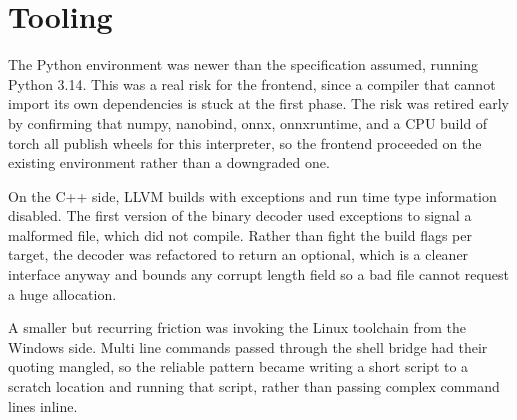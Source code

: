 \section{Tooling}

The Python environment was newer than the specification assumed, running Python
3.14. This was a real risk for the frontend, since a compiler that cannot import
its own dependencies is stuck at the first phase. The risk was retired early by
confirming that numpy, nanobind, onnx, onnxruntime, and a CPU build of torch all
publish wheels for this interpreter, so the frontend proceeded on the existing
environment rather than a downgraded one.

On the C++ side, LLVM builds with exceptions and run time type information
disabled. The first version of the binary decoder used exceptions to signal a
malformed file, which did not compile. Rather than fight the build flags per
target, the decoder was refactored to return an optional, which is a cleaner
interface anyway and bounds any corrupt length field so a bad file cannot request
a huge allocation.

A smaller but recurring friction was invoking the Linux toolchain from the Windows
side. Multi line commands passed through the shell bridge had their quoting
mangled, so the reliable pattern became writing a short script to a scratch
location and running that script, rather than passing complex command lines
inline.
